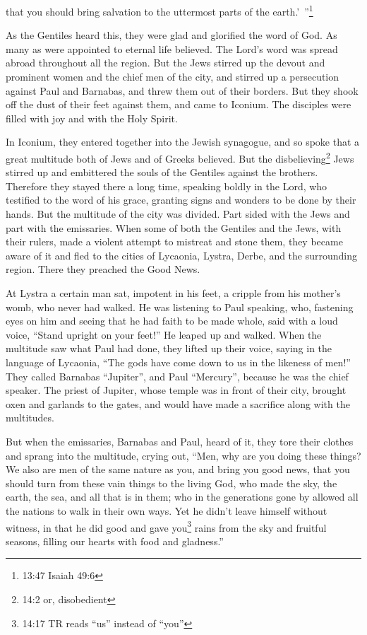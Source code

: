 that you should bring salvation to the uttermost parts of the earth.’ ”\footnote{13:47 Isaiah 49:6}

\myverse{}As the Gentiles heard this, they were glad and glorified the
word of God. As many as were appointed to eternal life believed.
\myverse{}The Lord’s word was spread abroad throughout all the region.
\myverse{}But the Jews stirred up the devout and prominent women and the chief men
of the city, and stirred up a persecution against Paul and Barnabas, and threw them out of their borders.
\myverse{}But they shook off the dust of their feet against them, and came to Iconium.
\myverse{}The disciples were filled with joy and with the Holy Spirit.


\mychapter{} \myverse*{}In Iconium, they entered together into the Jewish synagogue, and
so spoke that a great multitude both of Jews and of Greeks believed.
\myverse{}But the disbelieving\footnote{14:2 or, disobedient} Jews stirred up and embittered the souls of the Gentiles against the
brothers.
\myverse{}Therefore they stayed there a long time, speaking boldly in the Lord, who testified
to the word of his grace, granting signs and wonders to be done by their hands.
\myverse{}But the multitude of the city was divided. Part sided with the Jews and part
with the emissaries.
\myverse{}When some of both the Gentiles and the Jews, with their rulers, made a violent
attempt to mistreat and stone them,
\myverse{}they became aware of it and fled to the cities of Lycaonia, Lystra, Derbe,
and the surrounding region.
\myverse{}There they preached the Good News.

\myverse{}At Lystra a certain man sat, impotent in his feet, a cripple from
his mother’s womb, who never had walked.
\myverse{}He was listening to Paul speaking, who, fastening eyes on him and seeing that
he had faith to be made whole,
\myverse{}said with a loud voice, “Stand upright on your feet!” He leaped up and walked.
\myverse{}When the multitude saw what Paul had done, they lifted up their voice, saying
in the language of Lycaonia, “The gods have come down to us in the likeness of men!”
\myverse{}They called Barnabas “Jupiter”, and Paul “Mercury”, because he was the chief
speaker.
\myverse{}The priest of Jupiter, whose temple was in front of their city, brought oxen
and garlands to the gates, and would have made a sacrifice along with the multitudes.

\myverse{}But when the emissaries, Barnabas and Paul, heard of it, they
tore their clothes and sprang into the multitude, crying out,
\myverse{}“Men, why are you doing these things? We also are men of the same nature
as you, and bring you good news, that you should turn from these vain things to the living God, who made
the sky, the earth, the sea, and all that is in them;
\myverse{}who in the generations gone by allowed all the nations to walk in their own
ways.
\myverse{}Yet he didn’t leave himself without witness, in that he did good and gave
you\footnote{14:17 TR reads “us” instead of “you”} rains from the sky and fruitful seasons, filling our
hearts with food and gladness.”

